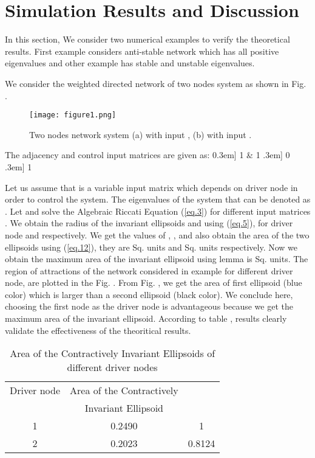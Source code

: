 \documentclass[conference]{IEEEtran}
\begin{document}
	\section{Simulation Results and Discussion}
In this section, We consider two numerical examples to verify the theoretical results. First example considers anti-stable network which has all positive eigenvalues and other example has stable and unstable eigenvalues.
	  	\begin{example}
	 	We consider the weighted directed network of two nodes system as shown in Fig. .
	 			\begin{figure}[!hbtp]
	 			\centering
	 			\texttt{[image: figure1.png]}
	 			\captionsetup{format=plain,justification=raggedright}
	 			\caption{Two nodes network system (a) with input  , (b) with input .}
	 			\label{fig:1}
	 			\end{figure}
	 	\end{example}	
	     The adjacency and control input matrices are given as:
	 	0.3em]
	 	1 & 1  \0.3em]
	 	         	0  \0.3em]
	 	         	1  \
	 	\par Let us assume that  is a variable input matrix which depends on  driver node in order to control the system. The eigenvalues of the system that can be denoted as . Let  and solve the Algebraic Riccati Equation (\ref{eq.3}) for different input matrices . We obtain the radius of the invariant ellipsoids  and  using (\ref{eq.5}), for driver node  and  respectively. We get the values of , , and also obtain the area of the two ellipsoids using (\ref{eq.12}), they are  Sq. units and  Sq. units respectively. Now we obtain the maximum area of the invariant ellipsoid using lemma  is  Sq. units.
	  The region of attractions of the network considered in example  for different driver node, are plotted in the Fig. . From Fig. , we get the area of first ellipsoid (blue color) which is larger than a second ellipsoid (black color). We conclude here, choosing the first node as the driver node is advantageous because we get the maximum area of the invariant ellipsoid. According to table , results clearly validate the effectiveness of the theoritical results.

\begin{table}[!hbtp]
\centering
\caption{Area of the Contractively Invariant Ellipsoids of different driver nodes}
\begin{tabular}{|c|c|c|}
\hline Driver node & Area of the Contractively &   \\
~& Invariant Ellipsoid & ~\\
\hline 1 & 0.2490 & 1 \\ 
\hline 2 & 0.2023 & 0.8124 \\ 
\hline
\end{tabular}
\end{table} 
\end{document}
